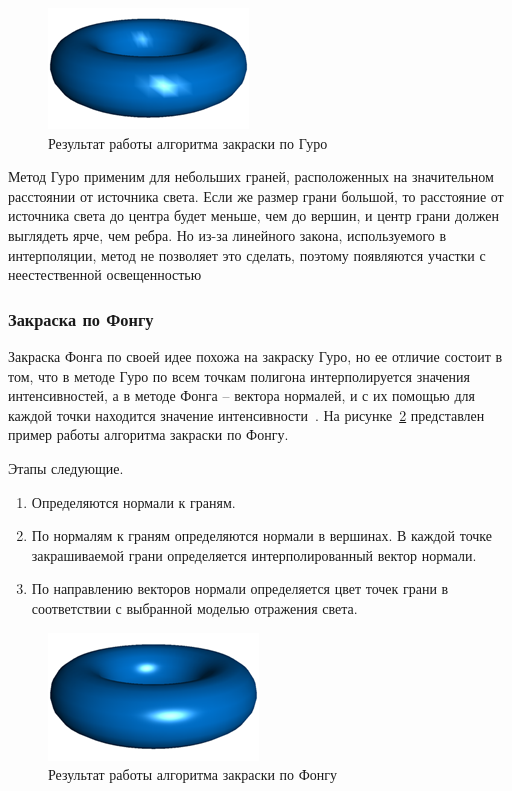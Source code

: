 \begin{figure}[h]
	\centering
	\includegraphics[height=0.15\textheight]{img/guro.png}
	\caption{Результат работы алгоритма закраски по Гуро}
	\label{img:guro}
\end{figure}

Метод Гуро применим для небольших граней, расположенных на значительном расстоянии от источника света. Если же размер грани большой, то расстояние от источника света до центра будет меньше, чем до вершин, и центр грани должен выглядеть ярче, чем ребра. 
Но из-за линейного закона, используемого в интерполяции, метод не позволяет это сделать, поэтому появляются участки с неестественной освещенностью

\subsubsection{Закраска по Фонгу}

Закраска Фонга по своей идее похожа на закраску Гуро, но ее отличие состоит в том, что в методе Гуро по всем точкам полигона интерполируется значения интенсивностей, а в методе Фонга – вектора нормалей, и с их помощью для каждой точки находится значение интенсивности~\cite{roders}.
На рисунке~\ref{img:fong} представлен пример работы алгоритма закраски по Фонгу.

Этапы следующие.
\begin{enumerate}
	\item Определяются нормали к граням.
	\item По нормалям к граням определяются нормали в вершинах. В каждой точке закрашиваемой грани определяется интерполированный вектор нормали.
	\item По направлению векторов нормали определяется цвет точек грани в соответствии с выбранной моделью отражения света.
\end{enumerate}

\begin{figure}[h]
	\centering
	\includegraphics[height=0.15\textheight]{img/fong.png}
	\caption{Результат работы алгоритма закраски по Фонгу}
	\label{img:fong}
\end{figure}

